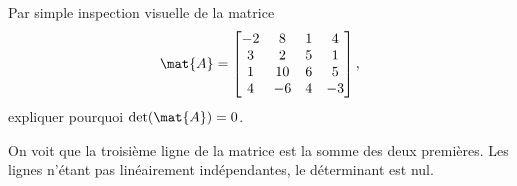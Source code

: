 \begin{exercice}
  Par simple inspection visuelle de la matrice
  \begin{displaymath}
    \mat{A} =
    \begin{bmatrix}
      -2 &  8 &  1 &   4 \\
       3 &  2 &  5 &   1 \\
       1 & 10 &  6 &   5 \\
       4 & -6 &  4 &  -3
    \end{bmatrix},
  \end{displaymath}
  expliquer pourquoi $\det(\mat{A}) = 0$.
  \begin{sol}
    On voit que la troisième ligne de la matrice est la somme des deux
    premières. Les lignes n'étant pas linéairement indépendantes, le
    déterminant est nul.
  \end{sol}
\end{exercice}

